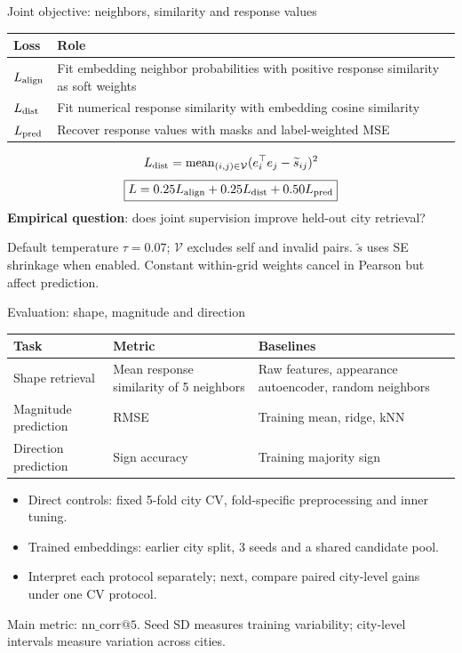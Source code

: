 \documentclass[aspectratio=169,11pt]{beamer}
\newcommand{\key}[1]{\textbf{\color{blue!55!black}#1}}
\begin{document}
\begin{frame}{Joint objective: neighbors, similarity and response values}
\small
\begin{tabular}{p{}p{}}
\toprule
Loss & Role\\
\midrule
$L_{\rm align}$ & Fit embedding neighbor probabilities with positive response similarity as soft weights\\
$L_{\rm dist}$ & Fit numerical response similarity with embedding cosine similarity\\
$L_{\rm pred}$ & Recover response values with masks and label-weighted MSE\\
\bottomrule
\end{tabular}
\[
L_{\rm dist}=\operatorname{mean}_{(i,j)\in\mathcal V}
(e_i^\top e_j-\widetilde s_{ij})^2
\]
\[
\boxed{L=0.25L_{\rm align}+0.25L_{\rm dist}+0.50L_{\rm pred}}
\]
\key{Empirical question}: does joint supervision improve held-out city retrieval?
\par\footnotesize Default temperature $\tau=0.07$; $\mathcal V$ excludes self and invalid pairs.
$\widetilde s$ uses SE shrinkage when enabled. Constant within-grid weights cancel in Pearson but affect prediction.
\end{frame}

\begin{frame}{Evaluation: shape, magnitude and direction}
\small
\begin{tabular}{p{}p{}p{}}
\toprule
Task & Metric & Baselines\\
\midrule
Shape retrieval & Mean response similarity of 5 neighbors & Raw features, appearance autoencoder, random neighbors\\
Magnitude prediction & RMSE & Training mean, ridge, kNN\\
Direction prediction & Sign accuracy & Training majority sign\\
\bottomrule
\end{tabular}
\begin{itemize}
 \item Direct controls: fixed 5-fold city CV, fold-specific preprocessing and inner tuning.
 \item Trained embeddings: earlier city split, 3 seeds and a shared candidate pool.
 \item Interpret each protocol separately; next, compare paired city-level gains under one CV protocol.
\end{itemize}
\footnotesize Main metric: $\mathrm{nn\_corr@5}$. Seed SD measures training variability; city-level intervals measure variation across cities.
\end{frame}
\end{document}
